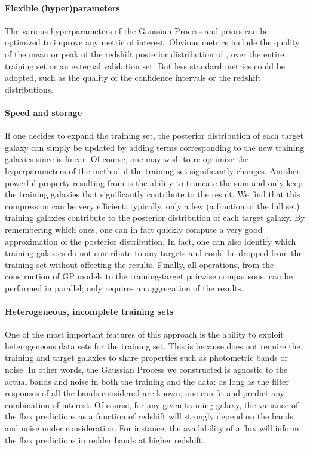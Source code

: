 \documentclass[aps,prd,showpacs,superscriptaddress,groupedaddress]{revtex4}  %
\begin{document}
\paragraph{Flexible (hyper)parameters}
The various hyperparameters of the Gaussian Process and priors can be optimized to improve any metric of interest.
Obvious metrics include the quality of the mean or peak of the redshift posterior distribution of , over the entire training set or an external validation set.
But less standard metrics could be adopted, such as the quality of the confidence intervals or the redshift distributions.

\paragraph{Speed and storage}
If one decides to expand the training set, the posterior distribution of each target galaxy can simply be updated by adding terms corresponding to the new training galaxies since  is linear.
Of course, one may wish to re-optimize the hyperparameters of the method if the training set significantly changes. 
Another powerful property resulting from  is the ability to truncate the sum and only keep the training galaxies that significantly contribute to the result.
We find that this compression can be very efficient: typically, only a few (\ie a fraction of the full set) training galaxies contribute to the posterior distribution of each target galaxy.
By remembering which ones, one can in fact quickly compute a very good approximation of the posterior distribution. 
In fact, one can also identify which training galaxies do not contribute to any targets and could be dropped from the training set without affecting the results.
Finally, all operations, from the construction of GP models to the training-target pairwise comparisons, can be performed in parallel; only  requires an aggregation of the results.
 
\paragraph{Heterogeneous, incomplete training sets} 
One of the most important features of this approach is the ability to exploit heterogeneous data sets for the training set.
This is because  does not require the training and target galaxies to share properties such as photometric bands or noise.
In other words, the Gaussian Process we constructed is agnostic to the actual bands and noise in both the training and the data: as long as the filter responses of all the bands considered are known, one can fit and predict any combination of interest.
Of course, for any given training galaxy, the variance of the flux predictions as a function of redshift will strongly depend on the bands and noise under consideration. 
For instance, the availability of a flux will inform the flux predictions in redder bands at higher redshift.
\end{document}
